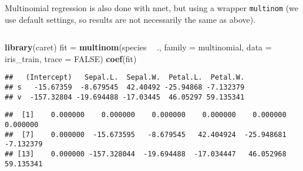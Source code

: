 \documentclass[10pt,ignorenonframetext,]{beamer}
\newenvironment{Shaded}{\begin{snugshade}}{\end{snugshade}}
\newcommand{\DataTypeTok}[1]{\textcolor[rgb]{0.13,0.29,0.53}{#1}}
\newcommand{\KeywordTok}[1]{\textcolor[rgb]{0.13,0.29,0.53}{\textbf{#1}}}
\newcommand{\NormalTok}[1]{#1}
\newcommand{\OperatorTok}[1]{\textcolor[rgb]{0.81,0.36,0.00}{\textbf{#1}}}
\newcommand{\OtherTok}[1]{\textcolor[rgb]{0.56,0.35,0.01}{#1}}
\newcommand{\StringTok}[1]{\textcolor[rgb]{0.31,0.60,0.02}{#1}}
\begin{document}
\begin{frame}[fragile]

Multinomial regression is also done with nnet, but using a wrapper
\texttt{multinom} (we use default settings, so results are not
necessarily the same as above).

\(~\)

\scriptsize

\begin{Shaded}
\begin{Highlighting}[]
\KeywordTok{library}\NormalTok{(caret)}
\NormalTok{fit =}\StringTok{ }\KeywordTok{multinom}\NormalTok{(species }\OperatorTok{~}\StringTok{ }\NormalTok{., }\DataTypeTok{family =}\NormalTok{ multinomial, }\DataTypeTok{data =}\NormalTok{ iris_train, }
    \DataTypeTok{trace =} \OtherTok{FALSE}\NormalTok{)}
\KeywordTok{coef}\NormalTok{(fit)}
\end{Highlighting}
\end{Shaded}

\begin{verbatim}
##   (Intercept)   Sepal.L.  Sepal.W.  Petal.L.  Petal.W.
## s   -15.67359  -8.679545  42.40492 -25.94868 -7.132379
## v  -157.32804 -19.694488 -17.03445  46.05297 59.135341
\end{verbatim}

\begin{Shaded}
\end{Shaded}

\begin{verbatim}
##  [1]    0.000000    0.000000    0.000000    0.000000    0.000000    0.000000
##  [7]    0.000000  -15.673595   -8.679545   42.404924  -25.948681   -7.132379
## [13]    0.000000 -157.328044  -19.694488  -17.034447   46.052968   59.135341
\end{verbatim}

\end{frame}
\end{document}
